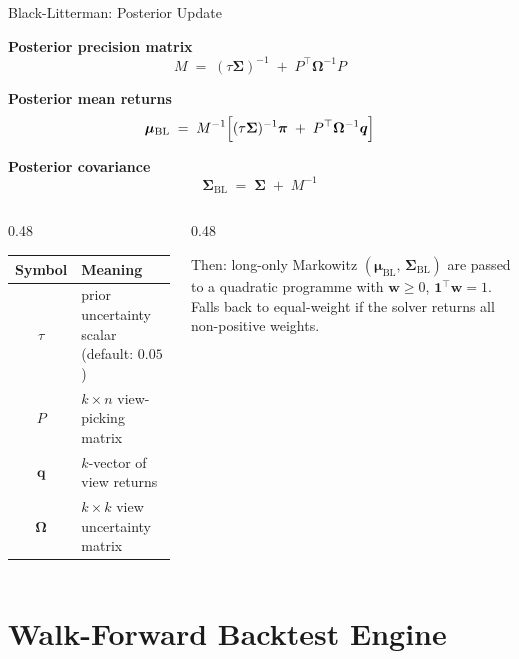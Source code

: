 \documentclass[aspectratio=169, 10pt]{beamer}
\newcommand{\BL}{\mathrm{BL}}
\begin{document}
\begin{frame}{Black-Litterman: Posterior Update}

  \textbf{Posterior precision matrix}
  \[
    M \;=\; (\tau\bm{\Sigma})^{-1} \;+\; P^{\top}\bm{\Omega}^{-1}P
  \]

  \textbf{Posterior mean returns}
  \[
    \bm{\mu}_{\BL} \;=\; M^{-1}
      \Bigl[(\tau\bm{\Sigma})^{-1}\bm{\pi} \;+\; P^{\top}\bm{\Omega}^{-1}\bm{q}\Bigr]
  \]

  \textbf{Posterior covariance}
  \[
    \bm{\Sigma}_{\BL} \;=\; \bm{\Sigma} \;+\; M^{-1}
  \]

  \medskip
  \begin{columns}[T]
    \begin{column}{0.48\textwidth}
      \begin{tabular}{@{}cl@{}}
        \toprule
        \textbf{Symbol} & \textbf{Meaning} \\
        \midrule
        $\tau$         & prior uncertainty scalar (default: $0.05$) \\
        $P$            & $k \times n$ view-picking matrix \\
        $\bm{q}$       & $k$-vector of view returns \\
        $\bm{\Omega}$  & $k \times k$ view uncertainty matrix \\
        \bottomrule
      \end{tabular}
    \end{column}

    \begin{column}{0.48\textwidth}
      \begin{alertblock}{Then: long-only Markowitz}
        \small
        $(\bm{\mu}_{\BL},\,\bm{\Sigma}_{\BL})$ are passed to a
        quadratic programme with $\bm{w} \ge 0$,\; $\mathbf{1}^{\top}\bm{w}=1$.\\[4pt]
        Falls back to equal-weight if the solver returns
        all non-positive weights.
      \end{alertblock}
    \end{column}
  \end{columns}
\end{frame}

\section{Walk-Forward Backtest Engine}
\end{document}
